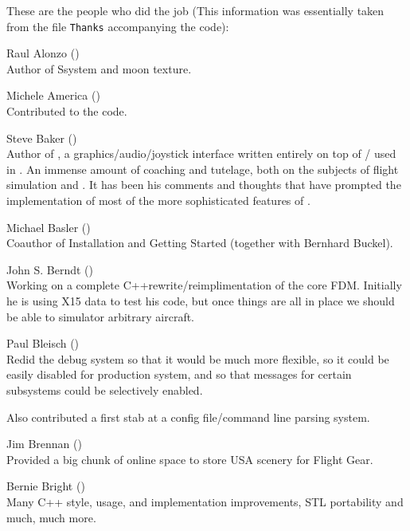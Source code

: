  \noindent
These are the people who did the job (This information was
essentially taken from the file \texttt{Thanks} accompanying the
code):
 \medskip

\noindent Raul Alonzo ()\\ Author of Ssystem and
moon texture.
 \medskip


\noindent Michele America
()\\
  Contributed to the  code.
 \medskip

\noindent Steve Baker ()\\
  Author of , a graphics/audio/joystick interface written entirely on top of
    /\- used in \FlightGear. An immense amount of coaching and tutelage,
    both on the subjects of flight simulation and .  It has been
    his comments and thoughts that have prompted the implementation of
    most of the more sophisticated features of \FlightGear{\hspace{-2mm}}.
 \medskip

\noindent Michael Basler ()\\
 Coauthor of Installation and Getting Started (together with Bernhard
 Buckel).
\medskip

\noindent John S. Berndt ()\\
 Working on a complete C++rewrite/reimplimentation of the core FDM.
  Initially he is using X15 data to test his code, but once things are
  all in place we should be able to simulator arbitrary aircraft.
\medskip


\noindent Paul Bleisch ()\\
  Redid the debug system so that it would be much more
  flexible, so it could be easily disabled for production system, and
  so that messages for certain subsystems could be selectively
  enabled.

  Also contributed a first stab at a config file/command line parsing
  system.
 \medskip


\noindent Jim Brennan ()\\
  Provided a big chunk of online space to store USA scenery for Flight Gear.
 \medskip

\noindent Bernie Bright ()\\
  Many C++ style, usage, and implementation improvements, STL
  portability and much, much more.
 \medskip


